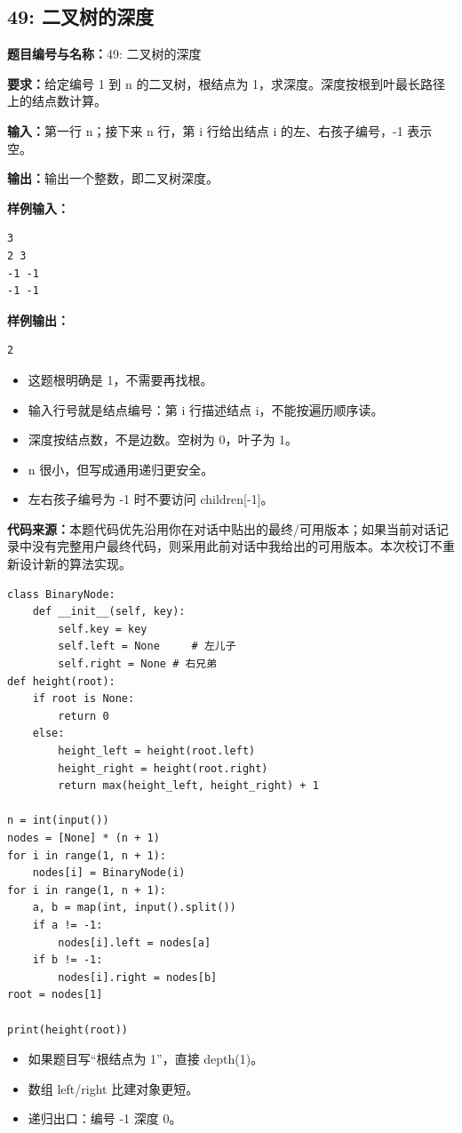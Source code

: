 \documentclass[10pt,a4paper,fontset=none]{ctexart}
\newcommand{\codesource}{\par\noindent\textbf{代码来源：}本题代码优先沿用你在对话中贴出的最终/可用版本；如果当前对话记录中没有完整用户最终代码，则采用此前对话中我给出的可用版本。本次校订不重新设计新的算法实现。\par\vspace{0.2em}}
\begin{document}
\subsection{49: 二叉树的深度}
\begin{taskbox}
\textbf{题目编号与名称：}49: 二叉树的深度\par
\textbf{要求：}给定编号 1 到 n 的二叉树，根结点为 1，求深度。深度按根到叶最长路径上的结点数计算。\par
\textbf{输入：}第一行 n；接下来 n 行，第 i 行给出结点 i 的左、右孩子编号，-1 表示空。\par
\textbf{输出：}输出一个整数，即二叉树深度。\par
\textbf{样例输入：}
\begin{lstlisting}[style=sample]
3
2 3
-1 -1
-1 -1
\end{lstlisting}
\textbf{样例输出：}
\begin{lstlisting}[style=sample]
2
\end{lstlisting}
\end{taskbox}
\begin{mistakebox}
\begin{itemize}
  \item 这题根明确是 1，不需要再找根。
  \item 输入行号就是结点编号：第 i 行描述结点 i，不能按遍历顺序读。
  \item 深度按结点数，不是边数。空树为 0，叶子为 1。
  \item n 很小，但写成通用递归更安全。
  \item 左右孩子编号为 -1 时不要访问 children[-1]。
\end{itemize}
\end{mistakebox}
\codesource
\begin{lstlisting}[style=py,caption={最终可用代码（对话来源）}]
class BinaryNode:
    def __init__(self, key):
        self.key = key
        self.left = None     # 左儿子
        self.right = None # 右兄弟
def height(root):
    if root is None:
        return 0
    else:
        height_left = height(root.left)
        height_right = height(root.right)
        return max(height_left, height_right) + 1

n = int(input())
nodes = [None] * (n + 1)
for i in range(1, n + 1):
    nodes[i] = BinaryNode(i)
for i in range(1, n + 1):
    a, b = map(int, input().split())
    if a != -1:
        nodes[i].left = nodes[a]
    if b != -1:
        nodes[i].right = nodes[b]
root = nodes[1]

print(height(root))
\end{lstlisting}
\begin{notebox}
\begin{itemize}
  \item 如果题目写“根结点为 1”，直接 depth(1)。
  \item 数组 left/right 比建对象更短。
  \item 递归出口：编号 -1 深度 0。
\end{itemize}
\end{notebox}
\end{document}
